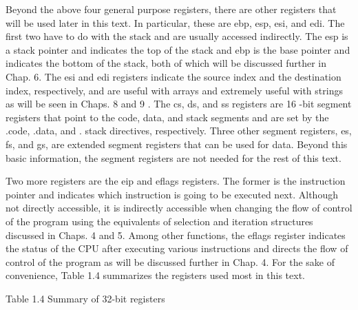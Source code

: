 \documentclass[10pt]{book}
\begin{document}
Beyond the above four general purpose registers, there are other registers that will be used later in this text. In particular, these are ebp, esp, esi, and edi. The first two have to do with the stack and are usually accessed indirectly. The esp is a stack pointer and indicates the top of the stack and ebp is the base pointer and indicates the bottom of the stack, both of which will be discussed further in Chap. 6. The esi and edi registers indicate the source index and the destination index, respectively, and are useful with arrays and extremely useful with strings as will be seen in Chaps. 8 and 9 . The cs, ds, and ss registers are 16 -bit segment registers that point to the code, data, and stack segments and are set by the .code, .data, and . stack directives, respectively. Three other segment registers, es, fs, and gs, are extended segment registers that can be used for data. Beyond this basic information, the segment registers are not needed for the rest of this text.

Two more registers are the eip and eflags registers. The former is the instruction pointer and indicates which instruction is going to be executed next. Although not directly accessible, it is indirectly accessible when changing the flow of control of the program using the equivalents of selection and iteration structures discussed in Chaps. 4 and 5. Among other functions, the eflags register indicates the status of the CPU after executing various instructions and directs the flow of control of the program as will be discussed further in Chap. 4. For the sake of convenience, Table 1.4 summarizes the registers used most in this text.

Table 1.4 Summary of 32-bit registers
\end{document}

